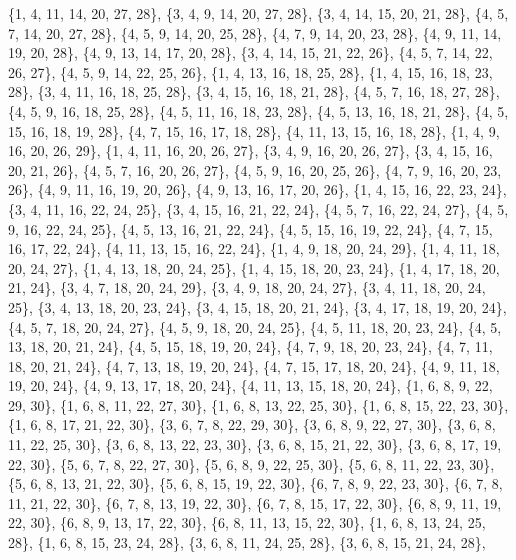 \documentclass[11pt,a4paper]{article}
\begin{document}
{\{1, 4, 11, 14, 20, 27, 28\}, \{3, 4, 9, 14, 20, 27, 28\}, \{3, 4, 14, 15, 20, 21, 28\}, \{4, 5, 7, 14, 20, 27, 28\}, \{4, 5, 9, 14, 20, 25, 28\},
\{4, 7, 9, 14, 20, 23, 28\}, \{4, 9, 11, 14, 19, 20, 28\}, \{4, 9, 13, 14, 17, 20, 28\}, \{3, 4, 14, 15, 21, 22, 26\}, \{4, 5, 7, 14, 22, 26, 27\},
\{4, 5, 9, 14, 22, 25, 26\}, \{1, 4, 13, 16, 18, 25, 28\}, \{1, 4, 15, 16, 18, 23, 28\}, \{3, 4, 11, 16, 18, 25, 28\}, \{3, 4, 15, 16, 18, 21, 28\},
\{4, 5, 7, 16, 18, 27, 28\}, \{4, 5, 9, 16, 18, 25, 28\}, \{4, 5, 11, 16, 18, 23, 28\}, \{4, 5, 13, 16, 18, 21, 28\}, \{4, 5, 15, 16, 18, 19, 28\},
\{4, 7, 15, 16, 17, 18, 28\}, \{4, 11, 13, 15, 16, 18, 28\}, \{1, 4, 9, 16, 20, 26, 29\}, \{1, 4, 11, 16, 20, 26, 27\}, \{3, 4, 9, 16, 20, 26, 27\},
\{3, 4, 15, 16, 20, 21, 26\}, \{4, 5, 7, 16, 20, 26, 27\}, \{4, 5, 9, 16, 20, 25, 26\}, \{4, 7, 9, 16, 20, 23, 26\}, \{4, 9, 11, 16, 19, 20, 26\},
\{4, 9, 13, 16, 17, 20, 26\}, \{1, 4, 15, 16, 22, 23, 24\}, \{3, 4, 11, 16, 22, 24, 25\}, \{3, 4, 15, 16, 21, 22, 24\}, \{4, 5, 7, 16, 22, 24, 27\},
\{4, 5, 9, 16, 22, 24, 25\}, \{4, 5, 13, 16, 21, 22, 24\}, \{4, 5, 15, 16, 19, 22, 24\}, \{4, 7, 15, 16, 17, 22, 24\}, \{4, 11, 13, 15, 16, 22, 24\},
\{1, 4, 9, 18, 20, 24, 29\}, \{1, 4, 11, 18, 20, 24, 27\}, \{1, 4, 13, 18, 20, 24, 25\}, \{1, 4, 15, 18, 20, 23, 24\}, \{1, 4, 17, 18, 20, 21, 24\},
\{3, 4, 7, 18, 20, 24, 29\}, \{3, 4, 9, 18, 20, 24, 27\}, \{3, 4, 11, 18, 20, 24, 25\}, \{3, 4, 13, 18, 20, 23, 24\}, \{3, 4, 15, 18, 20, 21, 24\},
\{3, 4, 17, 18, 19, 20, 24\}, \{4, 5, 7, 18, 20, 24, 27\}, \{4, 5, 9, 18, 20, 24, 25\}, \{4, 5, 11, 18, 20, 23, 24\}, \{4, 5, 13, 18, 20, 21, 24\},
\{4, 5, 15, 18, 19, 20, 24\}, \{4, 7, 9, 18, 20, 23, 24\}, \{4, 7, 11, 18, 20, 21, 24\}, \{4, 7, 13, 18, 19, 20, 24\}, \{4, 7, 15, 17, 18, 20, 24\},
\{4, 9, 11, 18, 19, 20, 24\}, \{4, 9, 13, 17, 18, 20, 24\}, \{4, 11, 13, 15, 18, 20, 24\}, \{1, 6, 8, 9, 22, 29, 30\}, \{1, 6, 8, 11, 22, 27, 30\},
\{1, 6, 8, 13, 22, 25, 30\}, \{1, 6, 8, 15, 22, 23, 30\}, \{1, 6, 8, 17, 21, 22, 30\}, \{3, 6, 7, 8, 22, 29, 30\}, \{3, 6, 8, 9, 22, 27, 30\},
\{3, 6, 8, 11, 22, 25, 30\}, \{3, 6, 8, 13, 22, 23, 30\}, \{3, 6, 8, 15, 21, 22, 30\}, \{3, 6, 8, 17, 19, 22, 30\}, \{5, 6, 7, 8, 22, 27, 30\},
\{5, 6, 8, 9, 22, 25, 30\}, \{5, 6, 8, 11, 22, 23, 30\}, \{5, 6, 8, 13, 21, 22, 30\}, \{5, 6, 8, 15, 19, 22, 30\}, \{6, 7, 8, 9, 22, 23, 30\},
\{6, 7, 8, 11, 21, 22, 30\}, \{6, 7, 8, 13, 19, 22, 30\}, \{6, 7, 8, 15, 17, 22, 30\}, \{6, 8, 9, 11, 19, 22, 30\}, \{6, 8, 9, 13, 17, 22, 30\},
\{6, 8, 11, 13, 15, 22, 30\}, \{1, 6, 8, 13, 24, 25, 28\}, \{1, 6, 8, 15, 23, 24, 28\}, \{3, 6, 8, 11, 24, 25, 28\}, \{3, 6, 8, 15, 21, 24, 28\},
}
\end{document}
